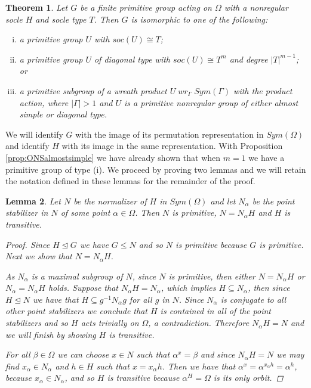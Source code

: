 \documentclass[]{article}
\newtheorem{thm}{Theorem}[section]
\newtheorem{lem}[thm]{Lemma}
\theoremstyle{definition}
\begin{document}
\begin{thm} \label{thm:ONSnonreg}
	Let $G$ be a finite primitive group acting on $\Omega$ with a nonregular socle $H$ and socle type $T$. Then $G$ is isomorphic to one of the following:
	\begin{enumerate} [(i)]
		\item a primitive group $U$ with $soc(U) \cong T$;
		\vspace{-0.2cm}\item a primitive group $U$ of diagonal type with $soc(U) \cong T^m$ and degree $|T|^{m-1}$; or
		\vspace{-0.3cm} \item a primitive subgroup of a wreath product $U \; wr_\Gamma \; Sym(\Gamma)$ with the product action, where $|\Gamma| > 1$ and $U$ is a primitive nonregular group of either almost simple or diagonal type.
	\end{enumerate}
\end{thm}

We will identify $G$ with the image of its permutation representation in $Sym(\Omega)$ and identify $H$ with its image in the same representation. With Proposition \ref{prop:ONSalmostsimple} we have already shown that when $m=1$ we have a primitive group of type (i). We proceed by proving two lemmas and we will retain the notation defined in these lemmas for the remainder of the proof.

\begin{lem} \label{lem:ONS1}
	Let $N$ be the normalizer of $H$ in $Sym(\Omega)$ and let $N_\alpha$ be the point stabilizer in $N$ of some point $\alpha \in \Omega$. Then $N$ is primitive, $N=N_\alpha H$ and $H$ is transitive.
	\begin{proof}
		Since $H \unlhd G$ we have $G \leqslant N$ and so $N$ is primitive because $G$ is primitive. Next we show that $N=N_\alpha H$. 
		
		As $N_\alpha$ is a maximal subgroup of $N$, since $N$ is primitive, then either $N=N_\alpha H$ or $N_\alpha = N_\alpha H$ holds. Suppose that $N_\alpha H = N_\alpha$, which implies $H \subseteq N_\alpha$, then since $H \unlhd N$ we have that $H \subseteq g^{-1}N_\alpha g$ for all $g$ in $N$. Since $N_\alpha$ is conjugate to all other point stabilizers we conclude that $H$ is contained in all of the point stabilizers and so $H$ acts trivially on $\Omega$, a contradiction. Therefore $N_\alpha H = N$ and we will finish by showing $H$ is transitive.
		
		For all $\beta \in \Omega$ we can choose $x \in N$ such that $\alpha^x = \beta$ and since $N_\alpha H = N$ we may find $x_\alpha \in N_\alpha$ and $h \in H$ such that $x=x_\alpha h$. Then we have that $\alpha^x = \alpha^{x_\alpha h} = \alpha^h$, because $x_\alpha \in N_\alpha$, and so $H$ is transitive because $\alpha^H = \Omega$ is its only orbit.
	\end{proof}
\end{lem}
\end{document}
